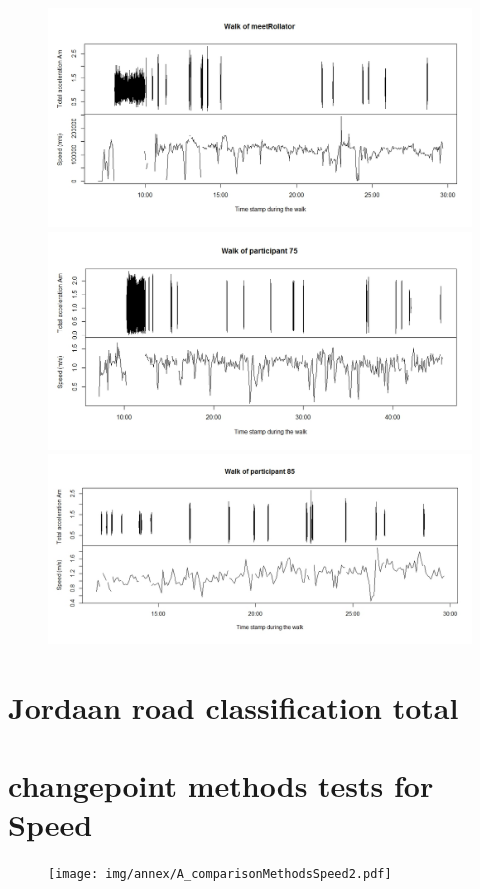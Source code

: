 \begin{appendix}
\begin{figure}[H]
\includegraphics[width=\textwidth]{img/annex/walkmeetrollator.jpeg}
\includegraphics[width=\textwidth]{img/annex/walkpart75.jpeg}
\includegraphics[width=\textwidth]{img/annex/walkpart85.jpeg}
\end{figure}
\clearpage

\section{Jordaan road classification total}\label{Ajordaan}



\clearpage

\section{changepoint methods tests for Speed}\label{Acptest}
\begin{figure}[H]
\texttt{[image: img/annex/A\_comparisonMethodsSpeed2.pdf]}
\end{figure}

\end{appendix}